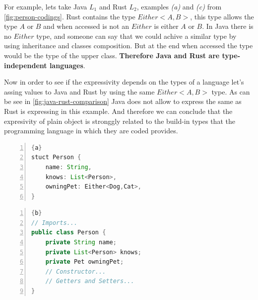 For example, lets take Java \textit{$L_1$} and Rust \textit{$L_2$}, examples \textit{(a)} and \textit{(c)} from \cref{fig:person-codings}.
Rust contains the type $Either<A,B>$, this type allows the type $A$ or $B$ and when accessed is not an $Either$ is either $A$ or $B$. In
Java there is no $Either$ type, and someone can say that we could achive a similar type by using inheritance and classes composition. But
at the end when accessed the type would be the type of the upper class. \textbf{Therefore Java and Rust are type-independent languages}.

Now in order to see if the expressivity depends on the types of a language let's assing values to Java and Rust by using the same
$Either<A,B>$ type. As can be see in \cref{fig:java-rust-comparison} Java does not allow to express the same as Rust is expressing
in this example. And therefore we can conclude that the expresivity of plain object is stronggly related to the build-in types that
the programming language in which they are coded provides.

\begin{center}
	\noindent\begin{minipage}[t]{.4\textwidth}
        \begin{lstlisting}[language=Java,frame=topline,numbers=left,title=\scriptsize{Person Rust Struct},
            basicstyle=\ttfamily\scriptsize]{a}
stuct Person {
    name: String,
    knows: List<Person>,
    owningPet: Either<Dog,Cat>,
}
		\end{lstlisting}
	\end{minipage}\hfill
	\begin{minipage}[t]{.5\textwidth}
        \begin{lstlisting}[language=Java, frame=t,numbers=left,title=\scriptsize{Person Java Object},
            basicstyle=\ttfamily\scriptsize]{b}
// Imports...
public class Person {
    private String name;
    private List<Person> knows;
    private Pet owningPet;
    // Constructor...
    // Getters and Setters...
}
		\end{lstlisting}
	\end{minipage}
	\label{fig:java-rust-comparison}
\end{center}


